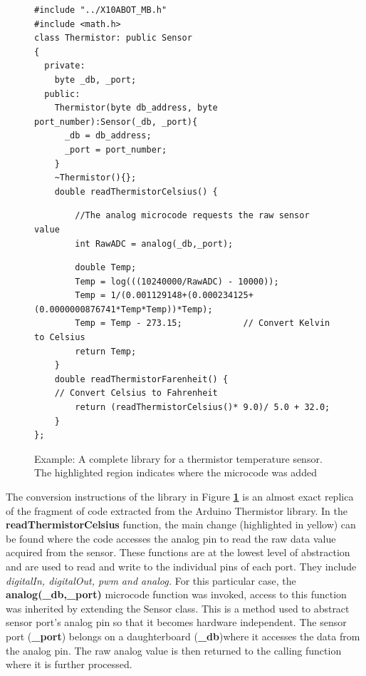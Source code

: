 \begin{figure}
		\footnotesize
        {\fontsize{8}{6}\selectfont
		
		\begin{verbatim}
#include "../X10ABOT_MB.h"
#include <math.h>
class Thermistor: public Sensor
{
  private:
    byte _db, _port;
  public:
    Thermistor(byte db_address, byte port_number):Sensor(_db, _port){
      _db = db_address;
      _port = port_number;
    }
    ~Thermistor(){};
    double readThermistorCelsius() {
    \end{verbatim}
    \begin{verbatim}
        //The analog microcode requests the raw sensor value
        int RawADC = analog(_db,_port); 
    \end{verbatim}
    \begin{verbatim}
        double Temp;
        Temp = log(((10240000/RawADC) - 10000));
        Temp = 1/(0.001129148+(0.000234125+(0.0000000876741*Temp*Temp))*Temp);
        Temp = Temp - 273.15;            // Convert Kelvin to Celsius
        return Temp;
    }
    double readThermistorFarenheit() {
    // Convert Celsius to Fahrenheit
        return (readThermistorCelsius()* 9.0)/ 5.0 + 32.0;
    }
};
	\end{verbatim}
		}
    \caption{Example: A complete library for a thermistor temperature sensor. The highlighted region indicates where the \xten microcode was added} \label{code:therm}
\end{figure}

The conversion instructions of the \xten library in Figure \textbf{\ref{code:therm} }is an almost exact replica of the fragment of code extracted from the Arduino Thermistor library. In the \textbf{readThermistorCelsius} function, the main change (highlighted in yellow) can be found where the code accesses the analog pin to read the raw data value acquired from the sensor. These functions are at the lowest level of abstraction and are used to read and write to the individual pins of each port. They include \emph{digitalIn, digitalOut, pwm and analog.} For this particular case, the \textbf{analog(\_db,\_port)} microcode function was invoked, access to this function was inherited by extending the Sensor class. This is a method used to abstract sensor port's analog pin so that it becomes hardware independent. The sensor port (\textbf{\_port}) belongs on a daughterboard (\textbf{\_db})where it accesses the data from the  analog pin. The raw analog value is then returned to the calling function where it is further processed.

